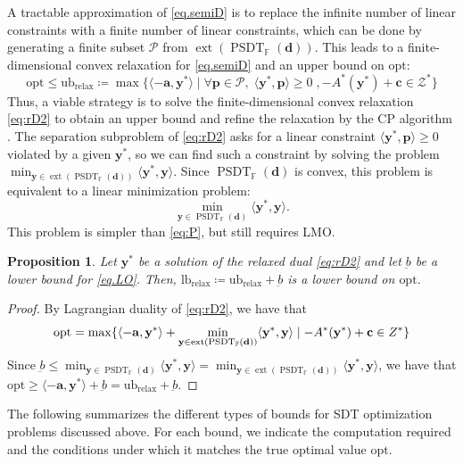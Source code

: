 \documentclass[smallextended]{svjour3}
\newtheorem{proposition}{Proposition}
\newcommand{\cP}{\mathcal P}
\newcommand{\F}{\mathbb F}
\newcommand{\cZ}{\mathcal Z}
\DeclareMathOperator{\SOST}{PSDT}
\newcommand{\1}{\mathbf{1}}
\newcommand{\y}{\mathbf{y}}
\newcommand{\p}{\mathbf{p}}
\newcommand{\bc}{\mathbf{c}}
\renewcommand{\a}{\mathbf{a}}
\newcommand{\opt}{\text{opt}}
\newcommand{\relx}{\text{relax}}
\newcommand{\lb}{\text{lb}}
\newcommand{\ub}{\text{ub}}
\DeclareMathOperator{\ext}{ext}
\newcommand{\inner}[2]{\langle #1, #2 \rangle}
\newcommand{\vc}[1]{\mathbf{#1}}
\newcommand{\vd}{\vc{d}}
\newcommand{\deq}{\coloneqq}
\begin{document}
A tractable approximation of \eqref{eq.semiD} is to replace the infinite number of linear constraints with a finite number of linear constraints, which can be done by generating a finite subset $\cP$ from $\ext(\SOST_{\F}(\vd))$. This leads to a finite-dimensional convex relaxation for \eqref{eq.semiD} and an upper bound on $\opt$:
\begin{equation}
    \label{eq:rD2} \tag{RelDSDTO}
 \opt \le  \ub_{\relx} \deq \max  \{\inner{-\a}{\y^*} \mid \forall \p \in \cP,\;  \inner{\y^\ast}{\p} \ge 0  \;,   - A^*(\y^*) + \bc\in \cZ^* \}
\end{equation}
Thus, a viable strategy is to solve the finite-dimensional convex relaxation \eqref{eq:rD2} to obtain an upper bound and refine the relaxation by the CP algorithm \cite{kortanek1993central}. The separation subproblem of \eqref{eq:rD2} asks for a linear constraint $\inner{\y^\ast}{\p} \ge 0$ violated by a given $\y^\ast$, so we can find such a constraint by solving the problem $\min_{\y \in \ext(\SOST_{\F}(\vd))}\inner{\y^\ast}{\y}$. Since $\SOST_{\F}(\vd)$ is convex, this problem is equivalent to a linear minimization problem:
\begin{equation}
    \label{eq.LO} \tag{LM}
    \min_{\y \in \SOST_{\F}(\vd)}\inner{\y^\ast}{\y}.
\end{equation}
 This problem is simpler than \eqref{eq:P}, but still requires LMO.


\begin{proposition}
Let $\y^\ast$ be a solution of the relaxed dual \eqref{eq:rD2} and let $\underbar{b}$ be a lower bound for \eqref{eq.LO}. Then, $\lb_{\relx}  \deq \ub_{\relx}  + \underbar{b}$ is a  lower bound on $\opt$.
\end{proposition}
\begin{proof}
    By Lagrangian duality of \eqref{eq:rD2}, we have that
    \begin{equation*}
      \opt = \max  \{\inner{-\a}{\y^*} + \min_{\y \in \ext(\SOST_{\F}(\vd)) } \inner{\y^\ast}{\y} \mid   - A^*(\y^*) + \bc\in \mathcal \cZ^* \}
    \end{equation*}
Since $\underbar{b} \le  \min_{\y \in \SOST_{\F}(\vd) } \inner{\y^\ast}{\y}  = \min_{\y \in \ext(\SOST_{\F}(\vd)) } \inner{\y^\ast}{\y}$, we have that $\opt \ge \inner{-\a}{\y^*} +  \underbar{b} = \ub_{\relx}  + \underbar{b}$.
\end{proof}


The following  summarizes the different types of bounds for SDT optimization problems discussed above. For each bound, we indicate the computation required and the conditions under which it matches the true optimal value $\opt$.
\end{document}
